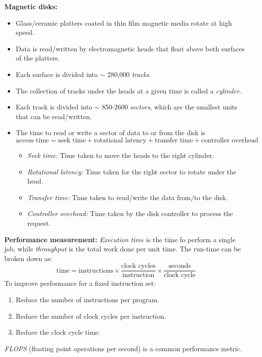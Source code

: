 \documentclass[12pt]{article}
\begin{document}
\textbf{Magnetic disks:} 
\begin{itemize}
    \item Glass/ceramic platters coated in thin film magnetic media rotate at high speed.
    \item Data is read/written by electromagnetic heads that float above both surfaces of the platters.
    \item Each surface is divided into $\sim$ 280,000 \textit{tracks}.
    \item The collection of tracks under the heads at a given time is called a \textit{cylinder}.
    \item Each track is divided into $\sim$ 850-2600 \textit{sectors}, which are the smallest units that can be read/written.
    \item The time to read or write a sector of data to or from the disk is
    $$\text{access time} = \text{seek time} + \text{rotational latency} + \text{transfer time} + \text{controller overhead}$$
    \begin{itemize}
        \item \textit{Seek time:} Time taken to move the heads to the right cylinder.
        \item \textit{Rotational latency:} Time taken for the right sector to rotate under the head.
        \item \textit{Transfer time:} Time taken to read/write the data from/to the disk.
        \item \textit{Controller overhead:} Time taken by the disk controller to process the request.
    \end{itemize}
\end{itemize}

\textbf{Performance measurement:} \textit{Execution time} is the time fo perform a single job, while \textit{throughput} is the total work done per unit time. The run-time can be broken down as:
$$
\text{time} = \text{instructions} \times \frac{\text{clock cycles}}{\text{instruction}} \times \frac{\text{seconds}}{\text{clock cycle}}
$$
To improve performance for a fixed instruction set:
\begin{enumerate}
    \item Reduce the number of instructions per program.
    \item Reduce the number of clock cycles per instruction.
    \item Reduce the clock cycle time.
\end{enumerate}

\textit{FLOPS} (floating point operations per second) is a common performance metric.
\end{document}
